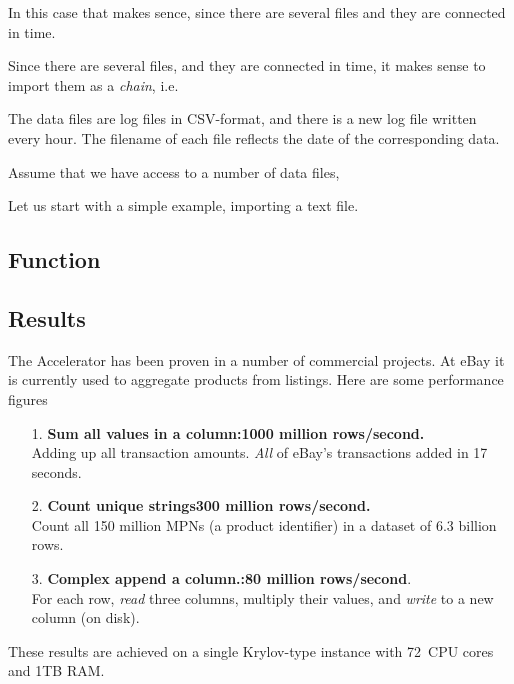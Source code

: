 \documentclass[a4paper]{article}
\begin{document}
In this case that makes sence, since there are several files and they
are connected in time.

Since there are several files, and they are
connected in time, it makes sense to import them as a \textsl{chain},
i.e.\ 


The data files are log files in CSV-format, and there is a new log
file written every hour.  The filename of each file reflects the date
of the corresponding data.




Assume that we have access to a number of data files,

Let us start with a simple example, importing a text file.







\subsection*{Function}


\subsection*{Results}
The Accelerator has been proven in a number of commercial projects.
At eBay it is currently used to aggregate products from listings.
Here are some performance figures
\begin{itemize}
\item[1.]  \textbf{Sum all values in a column:\hfill 1000 million rows/second.}\\
  Adding up all transaction amounts.  \textsl{All} of eBay's
  transactions added in 17 seconds.
\item[2.]  \textbf{Count unique strings\hfill  300 million rows/second.}\\
Count all 150 million MPNs (a product identifier) in a dataset of 6.3
billion rows.
\item[3.]  \textbf{Complex append a column.:\hfill 80 million rows/second}.\\
  For each row, \textsl{read} three columns, multiply their values,
  and \textsl{write} to a new column (on disk).
\end{itemize}

\noindent These results are achieved on a single Krylov-type instance with
72~CPU cores and 1TB RAM.




\end{document}
